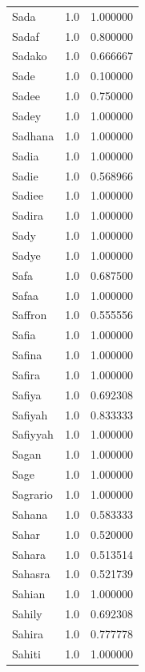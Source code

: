 \documentclass[
  letterpaper,
  DIV=11,
  numbers=noendperiod]{scrreprt}
\begin{document}
\begin{tabular}{lrr}
Sada            &   1.0 &   1.000000 \\
Sadaf           &   1.0 &   0.800000 \\
Sadako          &   1.0 &   0.666667 \\
Sade            &   1.0 &   0.100000 \\
Sadee           &   1.0 &   0.750000 \\
Sadey           &   1.0 &   1.000000 \\
Sadhana         &   1.0 &   1.000000 \\
Sadia           &   1.0 &   1.000000 \\
Sadie           &   1.0 &   0.568966 \\
Sadiee          &   1.0 &   1.000000 \\
Sadira          &   1.0 &   1.000000 \\
Sady            &   1.0 &   1.000000 \\
Sadye           &   1.0 &   1.000000 \\
Safa            &   1.0 &   0.687500 \\
Safaa           &   1.0 &   1.000000 \\
Saffron         &   1.0 &   0.555556 \\
Safia           &   1.0 &   1.000000 \\
Safina          &   1.0 &   1.000000 \\
Safira          &   1.0 &   1.000000 \\
Safiya          &   1.0 &   0.692308 \\
Safiyah         &   1.0 &   0.833333 \\
Safiyyah        &   1.0 &   1.000000 \\
Sagan           &   1.0 &   1.000000 \\
Sage            &   1.0 &   1.000000 \\
Sagrario        &   1.0 &   1.000000 \\
Sahana          &   1.0 &   0.583333 \\
Sahar           &   1.0 &   0.520000 \\
Sahara          &   1.0 &   0.513514 \\
Sahasra         &   1.0 &   0.521739 \\
Sahian          &   1.0 &   1.000000 \\
Sahily          &   1.0 &   0.692308 \\
Sahira          &   1.0 &   0.777778 \\
Sahiti          &   1.0 &   1.000000 \\

\end{tabular}
\end{document}
